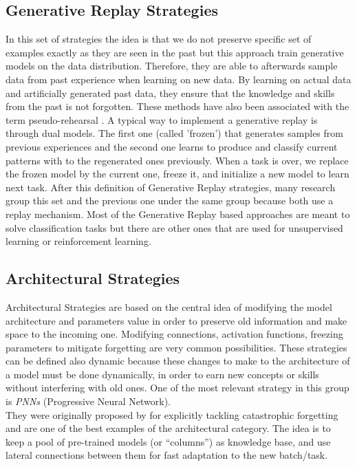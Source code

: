 \documentclass[english, LaM, oneside]{sapthesis}%
\begin{document}
\subsection{Generative Replay Strategies}
In this set of strategies the idea is that we do not preserve specific set of examples exactly as they are seen in the past but this approach train generative models on the data distribution. Therefore, they are able to afterwards sample data from past experience when learning on new data. By learning on actual data and artificially generated past data, they ensure that the knowledge and skills from the past is not forgotten. These methods have also been associated with the term pseudo-rehearsal \cite{robins} . A typical way to implement a generative replay is through dual models. The first one (called 'frozen') that generates samples from previous experiences and the second one learns to produce and classify current patterns with to the regenerated ones previously.  When a task is over, we replace the frozen model by the current one, freeze it, and initialize a new model to learn next task. After this definition of Generative Replay strategies, many research group this set and the previous one under the same group because both use a replay mechanism. Most of the Generative Replay based approaches are meant to solve classification tasks but there are other ones that are used for unsupervised learning or reinforcement learning.

\subsection{Architectural Strategies}
Architectural Strategies are based on the central idea of modifying the model architecture and parameters value in order to preserve old information and make space to the incoming one. Modifying connections, activation functions, freezing parameters to mitigate forgetting are very common possibilities. These strategies can be defined also dynamic because these changes to make to the architecture of a model must be done dynamically, in order to earn new concepts or skills without interfering with old ones. One of the most relevant strategy in this group is \textit{PNNs} (Progressive Neural Network). 
\\
They were originally proposed by \cite{rusu} for explicitly tackling catastrophic forgetting and are one of the best examples of the architectural category. The idea is to keep a pool of pre-trained models (or “columns”) as knowledge base, and use lateral connections between them for fast adaptation to the new batch/task.
\end{document}
